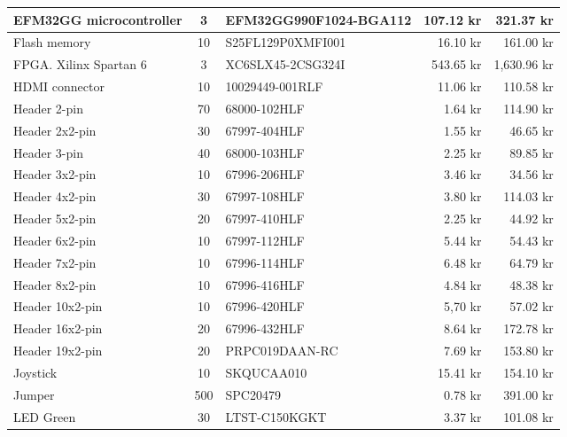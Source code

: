 \begin{longtable}{|p{3cm}|c|p{4.3cm}|r|r|}
    EFM32GG microcontroller & 3     & EFM32GG990F1024-BGA112    & 107.12 kr  & 321.37 kr   \\ \hline
    Flash memory            & 10    & S25FL129P0XMFI001         & 16.10 kr   & 161.00 kr   \\ \hline
    FPGA. Xilinx Spartan 6  & 3     & XC6SLX45-2CSG324I	        & 543.65 kr  & 1,630.96 kr \\ \hline
    HDMI connector          & 10    & 10029449-001RLF	        & 11.06 kr   & 110.58 kr   \\ \hline
    Header 2-pin            & 70    & 68000-102HLF	            & 1.64 kr    & 114.90 kr   \\ \hline
    Header 2x2-pin          & 30    & 67997-404HLF	            & 1.55 kr    & 46.65 kr    \\ \hline
    Header 3-pin            & 40    & 68000-103HLF	            & 2.25 kr    & 89.85 kr    \\ \hline
    Header 3x2-pin          & 10    & 67996-206HLF	            & 3.46 kr    & 34.56 kr    \\ \hline
    Header 4x2-pin          & 30    & 67997-108HLF	            & 3.80 kr    & 114.03 kr   \\ \hline
    Header 5x2-pin          & 20    & 67997-410HLF	            & 2.25 kr    & 44.92 kr    \\ \hline
    Header 6x2-pin          & 10    & 67997-112HLF	            & 5.44 kr    & 54.43 kr    \\ \hline
    Header 7x2-pin          & 10    & 67996-114HLF	            & 6.48 kr    & 64.79 kr    \\ \hline
    Header 8x2-pin          & 10    & 67996-416HLF	            & 4.84 kr    & 48.38 kr    \\ \hline
    Header 10x2-pin         & 10    & 67996-420HLF	            & 5,70 kr    & 57.02 kr    \\ \hline
    Header 16x2-pin         & 20    & 67996-432HLF	            & 8.64 kr    & 172.78 kr   \\ \hline
    Header 19x2-pin         & 20    & PRPC019DAAN-RC	        & 7.69 kr    & 153.80 kr   \\ \hline
    Joystick                & 10    & SKQUCAA010                & 15.41 kr   & 154.10 kr   \\ \hline
    Jumper                  & 500   & SPC20479                  & 0.78 kr    & 391.00 kr   \\ \hline
    LED Green               & 30    & LTST-C150KGKT	            & 3.37 kr    & 101.08 kr   \\ \hline

\end{longtable}
